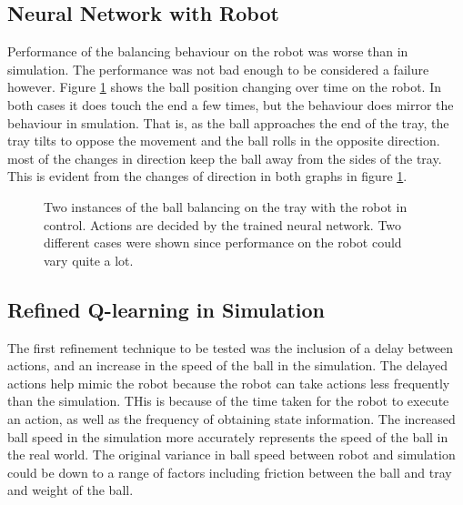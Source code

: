 \documentclass[12pt,a4paper]{article}
\begin{document}
\subsection{Neural Network with Robot}
Performance of the balancing behaviour on the robot was worse than in simulation. The performance was not bad enough to be considered a failure however. Figure \ref{nn_nao} shows the ball position changing over time on the robot. In both cases it does touch the end a few times, but the behaviour does mirror the behaviour in smulation. That is, as the ball approaches the end of the tray, the tray tilts to oppose the movement and the ball rolls in the opposite direction. most of the changes in direction keep the ball away from the sides of the tray. This is evident from the changes of direction in both graphs in figure \ref{nn_nao}.
\begin{figure}[H]
	\centering
	\caption{Two instances of the ball balancing on the tray with the robot in control. Actions are decided by the trained neural network. Two different cases were shown since performance on the robot could vary quite a lot.}
	\label{nn_nao}
\end{figure}
\subsection{Refined Q-learning in Simulation}
The first refinement technique to be tested was the inclusion of a delay between actions, and an increase in the speed of the ball in the simulation. The delayed actions help mimic the robot because the robot can take actions less frequently than the simulation. THis is because of the time taken for the robot to execute an action, as well as the frequency of obtaining state information. The increased ball speed in the simulation more accurately represents the speed of the ball in the real world. The original variance in ball speed between robot and simulation could be down to a range of factors including friction between the ball and tray and weight of the ball.
\end{document}
